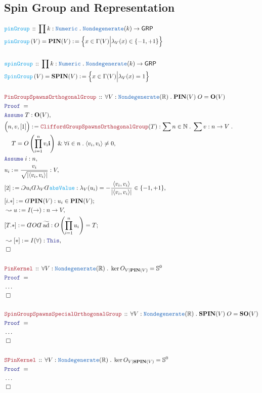 \documentclass[12pt]{scrartcl}%
\newcommand{\TYPE}[1]{\textcolor{NavyBlue}{\mathtt{#1}}}%
\newcommand{\FUNC}[1]{\textcolor{Cerulean}{\mathtt{#1}}}%
\newcommand{\LOGIC}[1]{\textcolor{Blue}{\mathtt{#1}}}%
\newcommand{\THM}[1]{\textcolor{Maroon}{\mathtt{#1}}}%
\renewcommand{\.}{\; . \;} %
\newcommand{\de}{: \kern 0.1pc =} %
\newcommand{\Act}[1]{\left( #1 \right)} %
\newcommand{\Theorem}[2]{& \THM{#1} \, :: \, #2 \\ & \Proof = \\ } %
\newcommand{\DeclareFunc}[2]{& \FUNC{#1} \, :: \, #2 \\}%
\newcommand{\DefineNamedFunc}[4]{&  \FUNC{#1}\Act{#2} = #3 \de #4 \\}%
\newcommand{\NewLine}{\\ & \kern 1pc}%
\newcommand{\Page}[1]{ \begin{align*} #1 \end{align*}  }%
\newcommand{ \bd }{ \ByDef }%
\newcommand{\NoProof}{ & \ldots \\ \EndProof}%
\renewcommand{\And}{\; \& \;}%
\newcommand{\Reals}{\mathbb{R}}%
\newcommand{\Nat}{\mathbb{N}}%
\newcommand{\Say}[3]{& #1 \de #2 : #3, \\} %
\newcommand{\Conclude}[3]{& #1 \de #2 : #3; \\}%
\newcommand{\Derive}[3]{& \leadsto #1 \de #2 : #3, \\} %
\newcommand{\Assume}[2]{& \LOGIC{Assume} \; #1 : #2, \\} %
\newcommand{\QED}{\; \square} %
\newcommand{\EndProof}{& \QED \\} %
\newcommand{\ByDef}{\rotatebox[origin=c]{-180}{$D$}}%
\newcommand{\ByConstr}{\rotatebox[origin=c]{-180}{$C$}}%
\newcommand{\Proof}{\LOGIC{Proof} \; } %
\newcommand{\GRP}{\mathsf{GRP}} %
\newcommand{\SO}{\mathbf{SO}}%
\renewcommand{\O}{\mathbf{O}}
\newcommand{\PIN}{\mathbf{PIN}}
\newcommand{\SPIN}{\mathbf{SPIN}}
\DeclareMathOperator{\tad}{\widetilde{ad}}%
\begin{document}
\subsection{Spin Group and Representation}
\Page{
	\DeclareFunc{pinGroup}{\prod k : 
		\TYPE{Numeric} \. 
		\TYPE{Nondegenerate}(k) \to \GRP  
	}
	\DefineNamedFunc{pinGroup}{V}{\PIN(V)}
	{\Big\{ x \in \Gamma(V) \Big| \lambda_V(x) \in \{-1,+1\}  \Big\}}
	\\
	\DeclareFunc{spinGroup}{\prod k : 
		\TYPE{Numeric} \. 
		\TYPE{Nondegenerate}(k) \to \GRP  
	}
	\DefineNamedFunc{SpinGroup}{V}{\SPIN(V)}
	{\Big\{ x \in \Gamma(V) \Big| \lambda_V(x) = 1  \Big\}}
	\\
	\Theorem{PinGroupSpawnsOrthogonalGroup}
	{
		\forall V : \TYPE{Nondegenerate}(\Reals) \.
		\PIN(V) \; O = \O(V)
	}
	\Assume{T}{\O(V)}
	\Say{\Big(n,v,[1]\Big)}{\THM{CliffordGroupSpawnsOrthogonalGroup}(T)}
	{ 
		\sum n \in \Nat \.
		\sum v : n \to V \.  \NewLine
		T = O\left( \prod^n_{i=1} v_i \mathbf{i} \right) 
		\And \forall i \in n \. \langle v_i, v_i \rangle \neq 0
	}
	\Assume{i}{n}
	\Say{u_i}{\frac{v_i}{\sqrt{|\langle v_i, v_i\rangle|}} }{V}
	\Say{[2]}{\ByConstr u_i \bd \lambda_V \bd \FUNC{absValue}}{
			\lambda_V(u_i) = 
			-\frac{\langle v_i, v_i\rangle}{|\langle v_i,v_i\rangle|}
			\in \{-1,+1\}
	}
	\Conclude{[i.*]}{\bd \PIN(V) }{u_i \in \PIN(V)}
	\Derive{u}{I(\to)}{  n \to V }
	\Conclude{[T.*]}{ \bd O \bd \tad }
	{
		O\left( \prod^n_{i=1} u_i  \right) = T
	}
	\Derive{[*]}{I(\forall)}{\LOGIC{This}}
	\EndProof
	\\
	\Theorem{PinKernel}
	{
		\forall V : \TYPE{Nondegenerate}(\Reals) \.
		\ker O_{V|\PIN(V)} = \mathbb{S}^0
	}
	\NoProof
	\\
	\Theorem{SpinGroupSpawnsSpecialOrthogonalGroup}
	{
		\forall V : \TYPE{Nondegenerate}(\Reals) \.
		\SPIN(V) \; O = \SO(V)
	}
	\NoProof
	\\
	\Theorem{SPinKernel}
	{
		\forall V : \TYPE{Nondegenerate}(\Reals) \.
		\ker O_{V|\SPIN(V)} = \mathbb{S}^0
	}
	\NoProof
}
\end{document}
